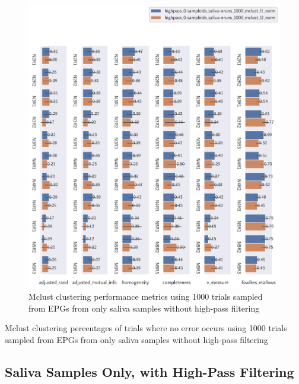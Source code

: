 \begin{theappendices}
\begin{figure}[htbp]
\centering
\includegraphics[width=\textwidth]{./figures/clust_comparison/highpass_0-sampleids_saliva-nruns_1000_mclust.pdf}
\caption{Mclust clustering performance metrics using 1000 trials sampled from EPGs from only saliva samples without high-pass filtering}
\label{appendix:fig:highpass_0-sampleids_saliva-nruns_1000_mclust}
\end{figure}

\begin{table}[htbp]
\centering
{}
\caption{Mclust clustering percentages of trials where no error occurs using 1000 trials sampled from EPGs from only saliva samples without high-pass filtering}
\label{appendix:table:highpass_0-sampleids_saliva-nruns_1000_mclust}
\end{table}

\FloatBarrier
\subsection{Saliva Samples Only, with High-Pass Filtering}


\end{theappendices}
